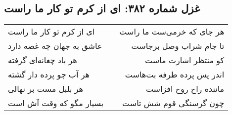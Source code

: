 \begin{center}
\section*{غزل شماره ۳۸۲: ای از کرم تو کار ما راست}
\label{sec:0382}
\begin{longtable}{l p{0.5cm} r}
ای از کرم تو کار ما راست
&&
هر جای که خرمی‌ست ما راست
\\
عاشق به جهان چه غصه دارد
&&
تا جام شراب وصل برجاست
\\
هر باد چغانه‌ای گرفته
&&
کو منتظر اشارت ماست
\\
هر آب چو پرده دار گشته
&&
اندر پس پرده طرفه بت‌هاست
\\
هر بلبل مست بر نهالی
&&
ماننده راح روح افزاست
\\
بسیار مگو که وقت آش است
&&
چون گرسنگی قوم شش تاست
\\
\end{longtable}
\end{center}
